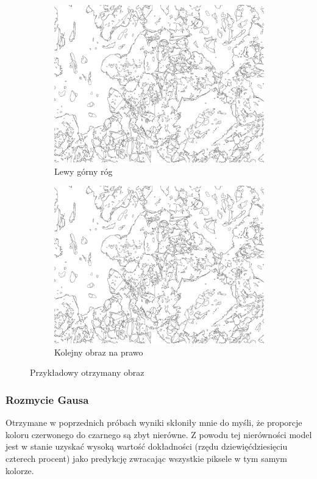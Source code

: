\documentclass{article}
\begin{document}
\begin{figure}[H]
  \centering
  \begin{subfigure}{0.4\linewidth}
    \includegraphics[width=\linewidth]{images/output.jpg}
    \caption{Lewy górny róg}
  \end{subfigure}
  \begin{subfigure}{0.4\linewidth}
    \includegraphics[width=\linewidth]{images/output.jpg}
    \caption{Kolejny obraz na prawo}
  \end{subfigure}
  \caption{Przykładowy otrzymany obraz}
  \label{fig:input_split}
\end{figure}

\subsubsection{Rozmycie Gausa}
Otrzymane w poprzednich próbach wyniki skłoniły mnie do myśli, że proporcje koloru czerwonego do czarnego są zbyt nierówne.
Z powodu tej nierówności model jest w stanie uzyskać wysoką wartość dokładności (rzędu dziewięćdziesięciu czterech procent) jako predykcję zwracając wszystkie piksele w tym samym kolorze.
\end{document}
